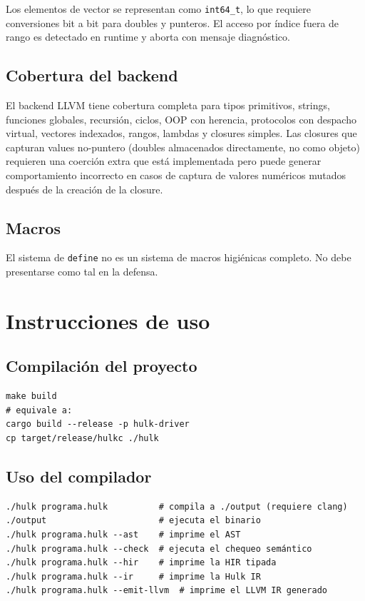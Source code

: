 \documentclass[12pt,letterpaper]{article}
\newcommand{\src}[1]{\texttt{#1}}
\begin{document}
Los elementos de vector se representan como \src{int64\_t}, lo que requiere conversiones bit a bit para doubles y punteros. El acceso por índice fuera de rango es detectado en runtime y aborta con mensaje diagnóstico.

\subsection{Cobertura del backend}

El backend LLVM tiene cobertura completa para tipos primitivos, strings, funciones globales, recursión, ciclos, OOP con herencia, protocolos con despacho virtual, vectores indexados, rangos, lambdas y closures simples. Las closures que capturan values no-puntero (doubles almacenados directamente, no como objeto) requieren una coerción extra que está implementada pero puede generar comportamiento incorrecto en casos de captura de valores numéricos mutados después de la creación de la closure.

\subsection{Macros}

El sistema de \src{define} no es un sistema de macros higiénicas completo. No debe presentarse como tal en la defensa.

\section{Instrucciones de uso}

\subsection{Compilación del proyecto}

\begin{lstlisting}[caption={Construcción del compilador}]
make build
# equivale a:
cargo build --release -p hulk-driver
cp target/release/hulkc ./hulk
\end{lstlisting}

\subsection{Uso del compilador}

\begin{lstlisting}[caption={Modos de uso del driver}]
./hulk programa.hulk          # compila a ./output (requiere clang)
./output                      # ejecuta el binario
./hulk programa.hulk --ast    # imprime el AST
./hulk programa.hulk --check  # ejecuta el chequeo semántico
./hulk programa.hulk --hir    # imprime la HIR tipada
./hulk programa.hulk --ir     # imprime la Hulk IR
./hulk programa.hulk --emit-llvm  # imprime el LLVM IR generado
\end{lstlisting}
\end{document}
